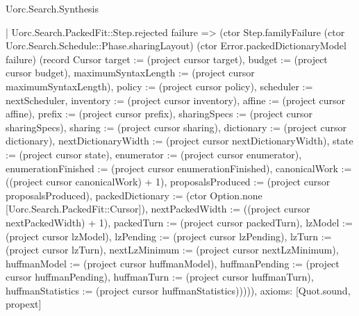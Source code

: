 \begin{lexlean}{Uorc.Search.Synthesis}
\begin{semanticmodule}
{      | Uorc.Search.PackedFit::Step.rejected failure => (ctor Step.familyFailure (ctor Uorc.Search.Schedule::Phase.sharingLayout) (ctor Error.packedDictionaryModel failure) (record Cursor {target := (project cursor target), budget := (project cursor budget), maximumSyntaxLength := (project cursor maximumSyntaxLength), policy := (project cursor policy), scheduler := nextScheduler, inventory := (project cursor inventory), affine := (project cursor affine), prefix := (project cursor prefix), sharingSpecs := (project cursor sharingSpecs), sharing := (project cursor sharing), dictionary := (project cursor dictionary), nextDictionaryWidth := (project cursor nextDictionaryWidth), state := (project cursor state), enumerator := (project cursor enumerator), enumerationFinished := (project cursor enumerationFinished), canonicalWork := ((project cursor canonicalWork) + 1), proposalsProduced := (project cursor proposalsProduced), packedDictionary := (ctor Option.none [Uorc.Search.PackedFit::Cursor]), nextPackedWidth := ((project cursor nextPackedWidth) + 1), packedTurn := (project cursor packedTurn), lzModel := (project cursor lzModel), lzPending := (project cursor lzPending), lzTurn := (project cursor lzTurn), nextLzMinimum := (project cursor nextLzMinimum), huffmanModel := (project cursor huffmanModel), huffmanPending := (project cursor huffmanPending), huffmanTurn := (project cursor huffmanTurn), huffmanStatistics := (project cursor huffmanStatistics)})))),
  axioms: [Quot.sound, propext]
}


\end{semanticmodule}
\end{lexlean}
